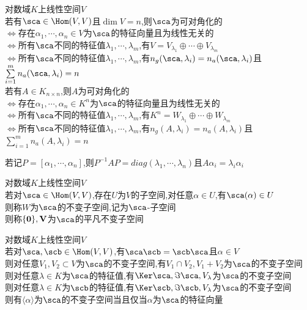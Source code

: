\begin{dingli}
对数域$K$上线性空间$V$\\
若有$\sca\in \Hom(V,V)$且$\dim V=n$,则$\sca$为可对角化的\\
$\Leftrightarrow$存在$\alpha_1,\cdots,\alpha_n\in V$为$\sca$的特征向量且为线性无关的\\
$\Leftrightarrow$所有$\sca$不同的特征值$\lambda_1,\cdots,\lambda_m$,有$V=V_{\lambda_1}\oplus\cdots\oplus V_{\lambda_m}$\\
$\Leftrightarrow$所有$\sca$不同的特征值$\lambda_1,\cdots,\lambda_m$,有$n_g(\sca,\lambda_i)=n_a(\sca,\lambda_i)$且$\sum\limits_{i=1}^{m}n_a(\sca,\lambda_i)=n$\\
若有$A\in K_{n\times n}$,则$A$为可对角化的\\
$\Leftrightarrow$存在$\alpha_1,\cdots,\alpha_n\in K^n$为$\sca$的特征向量且为线性无关的\\
$\Leftrightarrow$所有$\sca$不同的特征值$\lambda_1,\cdots,\lambda_m$,有$K^n=W_{\lambda_1}\oplus\cdots\oplus W_{\lambda_m}$\\
$\Leftrightarrow$所有$\sca$不同的特征值$\lambda_1,\cdots,\lambda_m$,有$n_g(A,\lambda_i)=n_a(A,\lambda_i)$且$\sum\limits_{i=1}^{m}n_a(A,\lambda_i)=n$
\end{dingli}

\begin{zhu}
若记$P=[\alpha_1,\cdots,\alpha_n]$,则$P^{-1}AP=diag(\lambda_1,\cdots,\lambda_n)$且$A\alpha_i=\lambda_i\alpha_i$
\end{zhu}

\begin{dingyi}
对数域$K$上线性空间$V$\\
若对$\sca\in \Hom(V,V)$,存在$U$为$V$的子空间,对任意$\alpha\in U$,有$\sca(\alpha)\in U$\\
则称$W$为$\sca$的不变子空间,记为$\sca$-子空间\\
则称$\{\bf0\},V$为$\sca$的平凡不变子空间
\end{dingyi}

\begin{dingli}
对数域$K$上线性空间$V$\\
若对$\sca,\scb\in \Hom(V,V)$,有$\sca\scb=\scb\sca$且$\alpha\in V$\\
则对任意$V_1,V_2\subset V$为$\sca$的不变子空间,有$V_1\cap V_2,V_1+V_2$为$\sca$的不变子空间\\
则对任意$\lambda\in K$为$\sca$的特征值,有$\Ker\sca,\Im\sca,V_{\lambda}$为$\sca$的不变子空间\\
则对任意$\lambda\in K$为$\scb$的特征值,有$\Ker\scb,\Im\scb,V_{\lambda}$为$\sca$的不变子空间\\
则有$\langle\alpha\rangle$为$\sca$的不变子空间当且仅当$\alpha$为$\sca$的特征向量
\end{dingli}

